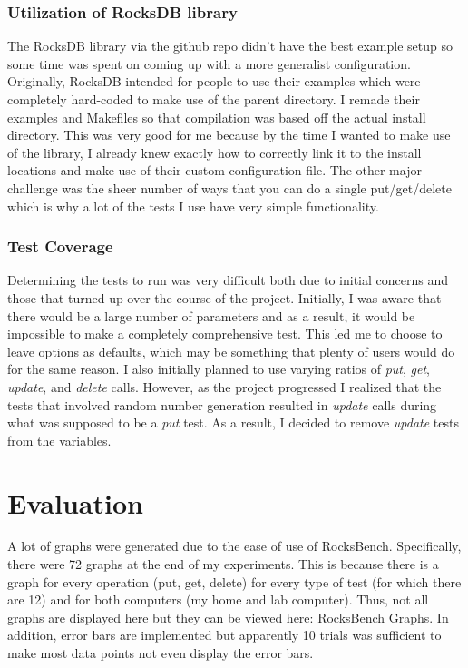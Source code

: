 \documentclass[twocolumn,11pt]{article}
\begin{document}
\subsubsection{Utilization of RocksDB library}

The RocksDB library via the github repo didn't have the best example setup so
some time was spent on coming up with a more generalist configuration.
Originally, RocksDB intended for people to use their examples which were
completely hard-coded to make use of the parent directory. I remade their
examples and Makefiles so that compilation was based off the actual install
directory. This was very good for me because by the time I wanted to make use of
the library, I already knew exactly how to correctly link it to the install
locations and make use of their custom configuration file. The other major
challenge was the sheer number of ways that you can do a single put/get/delete
which is why a lot of the tests I use have very simple functionality.

\subsubsection{Test Coverage}

Determining the tests to run was very difficult both due to initial concerns and
those that turned up over the course of the project. Initially, I was aware that
there would be a large number of parameters and as a result, it would be
impossible to make a completely comprehensive test. This led me to choose to
leave options as defaults, which may be something that plenty of users would do
for the same reason. I also initially planned to use varying ratios of
\textit{put}, \textit{get}, \textit{update}, and \textit{delete} calls. However,
as the project progressed I realized that the tests that involved random number
generation resulted in \textit{update} calls during what was supposed to be a
\textit{put} test. As a result, I decided to remove \textit{update} tests from
the variables.

\section{Evaluation}

A lot of graphs were generated due to the ease of use of RocksBench.
Specifically, there were 72 graphs at the end of my experiments. This is because
there is a graph for every operation (put, get, delete) for every type of test
(for which there are 12) and for both computers (my home and lab computer).
Thus, not all graphs are displayed here but they can be viewed here:
\href{https://github.com/legendddhgf/Database_Systems_Project/tree/master/project/doc/Pictures}
{RocksBench Graphs}.
In addition, error bars are implemented but apparently 10 trials was sufficient
to make most data points not even display the error bars.
\end{document}
